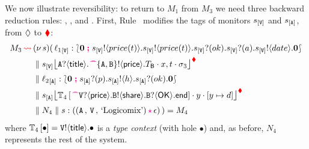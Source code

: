 \documentclass[runningheads,plain]{llncs}
\begin{document}
We now illustrate  reversibility: to return to $M_1$ from $M_3$ we need  three backward 
reduction
rules: , , and .
First, Rule~ 
modifies the tags of monitors $s_{[\mathtt{V}]}$ and $s_{[\mathtt{A}]}$, from $\lozenge$ to $\textcolor{red}{\blacklozenge}$:
\begin{align*}
M_3  \bk  &\news{s}(\,  
\np{\key{{\loc_1}}{\pS}}{ \conf{\inact}{\bout{\epS}{price(t)}\bout{\epS}{price(t)}\binp{\epS}{ok}  \binp{\epS}{a} \bout{\epS}{date}\inact }} 
\\
& \Par 
 \monir{\ep{s}{\pS}}{\ltinp{A}{\mathsf{title}}{\past \ltout{\{A,B\}}{\mathsf{price}}{T_\mathsf{B}}}}{x,t}{\store_3} 
 \\
& \Par \np{\key{{\loc_2}}{\pA}}{ \conf{\inact}{\binp{\epA}{p}\bout{\epA}{h}\binp{\epA}{ok}\inact}} 
\\
& \Par 
\monir{\ep{s}{\pA}}{\myctxr{\ctx{T}_4}{\past \ltinp{\pS}{\mathsf{price}}{\ltout{B}{\mathsf{share}}{\ltinp{B}{\mathsf{OK}}{\lend}}}}}{y}{\upd{y}{d}} 
\\
& \Par N_4 \Par \codah{s}{\valueq{\pA}{\pS}{\exBook}}{\emp}{}~)  = M_4
\end{align*}
where 
${\mathbb{T}_4\left[\textcolor{black}{\bullet}\right]}  =\mathtt{\mathtt{V}}!\langle\mathsf{title}\rangle.\bullet$ is a  \emph{type context} (with hole $\bullet$) and, as before, $N_4$ represents the rest of the system.
\end{document}
